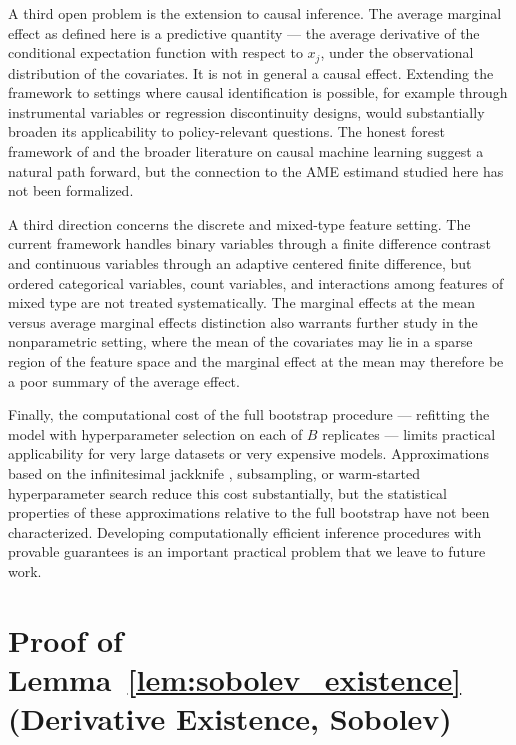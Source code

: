 \documentclass[12pt]{article}
\begin{document}
	A third open problem is the extension to causal inference. The average marginal effect as defined here is a predictive quantity --- the average derivative of the conditional expectation function with respect to $x_j$, under the observational distribution of the covariates. It is not in general a causal effect. Extending the framework to settings where causal identification is possible, for example through instrumental variables or regression discontinuity designs, would substantially broaden its applicability to policy-relevant questions. The honest forest framework of \citet{wager2018forests} and the broader literature on causal machine learning suggest a natural path forward, but the connection to the AME estimand studied here has not been formalized.
	
	A third direction concerns the discrete and mixed-type feature setting. The current framework handles binary variables through a finite difference contrast and continuous variables through an adaptive centered finite difference, but ordered categorical variables, count variables, and interactions among features of mixed type are not treated systematically. The marginal effects at the mean versus average marginal effects distinction \citep{greene2012, wooldridge2010} also warrants further study in the nonparametric setting, where the mean of the covariates may lie in a sparse region of the feature space and the marginal effect at the mean may therefore be a poor summary of the average effect.
	
	Finally, the computational cost of the full bootstrap procedure --- refitting the model with hyperparameter selection on each of $B$ replicates --- limits practical applicability for very large datasets or very expensive models. Approximations based on the infinitesimal jackknife \citep{wager2014confidence}, subsampling, or warm-started hyperparameter search reduce this cost substantially, but the statistical properties of these approximations relative to the full bootstrap have not been characterized. Developing computationally efficient inference procedures with provable guarantees is an important practical problem that we leave to future work.
	
	\appendix
	
	\section{Proof of Lemma~\ref{lem:sobolev_existence}
		(Derivative Existence, Sobolev)}
	\label{app:lem_sobolev_existence}
	
\end{document}
